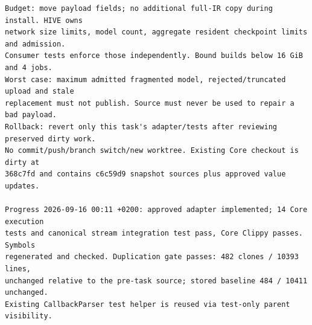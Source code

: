 \documentclass{article}
\begin{document}
\begin{verbatim}
Budget: move payload fields; no additional full-IR copy during install. HIVE owns
network size limits, model count, aggregate resident checkpoint limits and admission.
Consumer tests enforce those independently. Bound builds below 16 GiB and 4 jobs.
Worst case: maximum admitted fragmented model, rejected/truncated upload and stale
replacement must not publish. Source must never be used to repair a bad payload.
Rollback: revert only this task's adapter/tests after reviewing preserved dirty work.
No commit/push/branch switch/new worktree. Existing Core checkout is dirty at
368c7fd and contains c6c59d9 snapshot sources plus approved value updates.

Progress 2026-09-16 00:11 +0200: approved adapter implemented; 14 Core execution
tests and canonical stream integration test pass, Core Clippy passes. Symbols
regenerated and checked. Duplication gate passes: 482 clones / 10393 lines,
unchanged relative to the pre-task source; stored baseline 484 / 10411 unchanged.
Existing CallbackParser test helper is reused via test-only parent visibility.
\end{verbatim}

\end{document}
